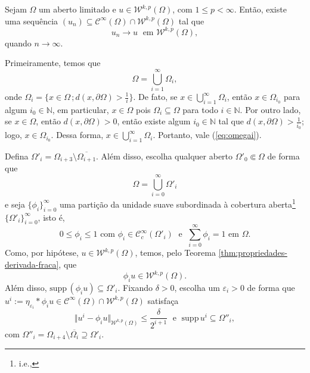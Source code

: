 \documentclass[a4paper, 11pt]{book}
\theoremstyle{definition}
\newcommand{\bN}{\mathbb{N}}
\newcommand{\cC}{\mathcal{C}}
\newcommand{\cW}{\mathcal{W}}
\newcommand{\supp}{\mathrm{supp}\,}
\begin{document}
\begin{tbox} \label{thm:aprox-2}
    Sejam $\Omega$ um aberto limitado e $u \in \cW^{k,p}(\Omega)$, com $1 \leqslant p < \infty$.
    Então, existe uma sequência $(u_n) \subseteq \cC^{\infty}(\Omega) \cap \cW^{k,p}(\Omega)$ tal que
    \[
        u_n \to u \;\text{ em } \cW^{k,p}(\Omega),
    \] 
    quando $n \to \infty$.
\end{tbox}
\begin{prf}
    Primeiramente, temos que
    \begin{equation} \label{eq:omegai}
        \Omega = \bigcup_{i=1}^\infty \Omega_i,
    \end{equation}
    onde $\Omega_i = \{x \in \Omega \,; d(x, \partial\Omega) > \tfrac{1}{i}\}$. De fato,
    se $x \in \bigcup_{i=1}^\infty \Omega_i$, então $x \in \Omega_{i_0}$ para algum $i_0 \in \bN$, em particular, $x \in \Omega$ pois $\Omega_i \subseteq \Omega$ para todo $i \in \bN$.
    Por outro lado, se $x \in \Omega$, então $d(x,\partial \Omega) > 0$, então existe algum $i_0 \in \bN$ tal que $d(x, \partial \Omega) > \frac{1}{i_0}$; logo, $x \in \Omega_{i_0}$. Dessa forma, $x \in \bigcup_{i=1}^\infty \Omega_i$.
    Portanto, vale (\ref{eq:omegai}). 
    
    Defina $\Omega'_i = \Omega_{i+3} \setminus \overline{\Omega_{i+1}}$.
    Além disso, escolha qualquer aberto $\Omega'_0 \Subset \Omega$ de forma que
    \[
        \Omega = \bigcup_{i=0}^\infty \Omega'_i
    \]
    e seja $\{\phi_i\}_{i=0}^\infty$ uma partição da unidade suave subordinada à cobertura aberta\footnote{i.e.,} $\{\Omega'_i\}_{i=0}^\infty$, isto é,
    \[
       0 \leqslant \phi_i \leqslant 1 \text{ com } \phi_i \in \cC^\infty_c(\Omega'_i) \;\text{ e }\; \sum_{i=0}^\infty \phi_i = 1 \text{ em } \Omega.
    \]
    Como, por hipótese, $u \in \cW^{k,p}(\Omega)$, temos, pelo Teorema \ref{thm:propriedades-derivada-fraca}, que
    \[
        \phi_i u \in \cW^{k,p}(\Omega).
    \]
    Além disso, $\supp(\phi_i u) \subseteq \Omega'_i$.
    Fixando $\delta > 0$, escolha um $\varepsilon_i > 0$ de forma que $u^i := \eta_{\varepsilon_i} * \phi_i u \in \cC^{\infty}(\Omega) \cap \cW^{k,p}(\Omega)$ satisfaça
    \[
        \Vert u^i - \phi_i u \Vert_{\cW^{k,p}(\Omega)} \leqslant \frac{\delta}{2^{i+1}} \;\text{ e }\; \supp u^i \subseteq \Omega''_i,
    \]
    com $\Omega''_i = \Omega_{i+4} \setminus \overline{\Omega_{i}} \supseteq \Omega'_i$.


\end{prf}
\end{document}
